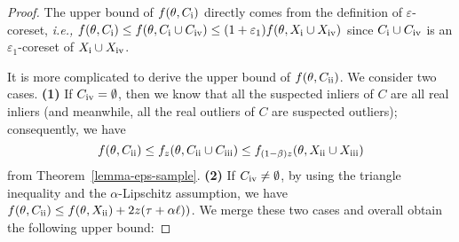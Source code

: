 \documentclass{article}
\newcommand{\Rnum}[1]{\uppercase\expandafter{\romannumeral #1} }
\begin{document}
\begin{proof}
The upper bound of $ f(\theta,C_\mathrm{\Rnum{1}}) $ directly comes from the definition of $\varepsilon$-coreset, {\em i.e.,} $ f(\theta,C_\mathrm{\Rnum{1}})\leq f(\theta,C_\mathrm{\Rnum{1}}\cup C_\mathrm{\Rnum{4}})\leq (1+\varepsilon_1) f(\theta,X_\mathrm{\Rnum{1}}\cup X_\mathrm{\Rnum{4}}) $ since $ C_\mathrm{\Rnum{1}}\cup C_\mathrm{\Rnum{4}} $ is an $ \varepsilon_1 $-coreset of $ X_\mathrm{\Rnum{1}}\cup X_\mathrm{\Rnum{4}} $.


It is more complicated to derive the upper bound of $ f(\theta,C_\mathrm{\Rnum{2}}) $. We consider two cases. \textbf{(1)} If $ C_\mathrm{\Rnum{4}}=\emptyset $,  then we know that all the suspected inliers of $C$ are all real inliers (and meanwhile, all the real outliers of $C$ are suspected outliers); consequently, we have  
\begin{equation}
f(\theta,C_\mathrm{\Rnum{2}})\leq f_{z}(\theta,C_\mathrm{\Rnum{2}}\cup C_\mathrm{\Rnum{3}})\leq f_{(1-\beta)z}(\theta,X_\mathrm{\Rnum{2}}\cup X_\mathrm{\Rnum{3}}) 
\end{equation}
from Theorem~\ref{lemma-eps-sample}. \textbf{(2)}  If $ C_\mathrm{\Rnum{4}}\neq\emptyset $, by using the triangle inequality and the $\alpha$-Lipschitz assumption, we have $ f(\theta,C_\mathrm{\Rnum{2}})\leq f(\theta,X_\mathrm{\Rnum{2}})+2z(\tau+\alpha \ell))$. We merge these two cases and overall obtain the following upper bound:

\end{proof}
\end{document}
